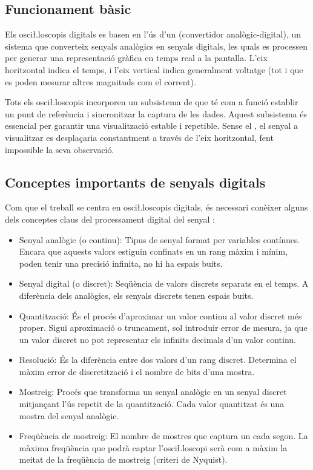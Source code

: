 \documentclass{tfgitic}[2023/06/30]
\begin{document}
\subsection{Funcionament bàsic}
\label{subsec:funcionament-bàsic}

Els osci\l.loscopis digitals es basen en l'ús d'un 
(convertidor analògic-digital), un sistema que converteix senyals
analògics en senyals digitals, les quals es processen per generar una
representació gràfica en temps real a la pantalla. L'eix horitzontal
indica el temps, i l'eix vertical indica generalment voltatge (tot i
que es poden mesurar altres magnituds com el corrent).

Tots els osci\l.loscopis incorporen un subsistema de 
\cite{funcionament-trigger} que té com a funció establir un punt de
referència i sincronitzar la captura de les dades. Aquest subsistema
és essencial per garantir una visualització estable i repetible. Sense
el , el senyal a visualitzar es desplaçaria constantment
a través de l'eix horitzontal, fent impossible la seva observació.

\subsection{Conceptes importants de senyals digitals}
\label{subsec:conceptes-pds}

Com que el treball se centra en osci\l.loscopis digitals, és necessari
conèixer alguns dels conceptes claus del processament digital del
senyal \cite{llibre-pds}:

\begin{itemize}
	\item Senyal analògic (o continu): Tipus de senyal format per
          variables contínues. Encara que aquests valors estiguin
          confinats en un rang màxim i mínim, poden tenir una precisió
          infinita, no hi ha espais buits.
	\item Senyal digital (o discret): Seqüència de valors discrets
          separats en el temps. A diferència dels analògics, els
          senyals discrets tenen espais buits.
	\item Quantització: És el procés d'aproximar un valor continu
          al valor discret més proper. Sigui aproximació o truncament,
          sol introduir error de mesura, ja que un valor discret no
          pot representar els infinits decimals d'un valor continu.
	\item Resolució: És la diferència entre dos valors d'un rang
          discret. Determina el màxim error de discretització i el
          nombre de bits d'una mostra.
	\item Mostreig: Procés que transforma un senyal analògic en un
          senyal discret mitjançant l'ús repetit de la quantització.
          Cada valor quantitzat és una mostra del senyal analògic.
	\item Freqüència de mostreig: El nombre de mostres que captura
          un  cada segon. La màxima freqüència que podrà
          captar l'osci\l.loscopi serà com a màxim la meitat de la
          freqüència de mostreig (criteri de Nyquist).
\end{itemize}
\end{document}
